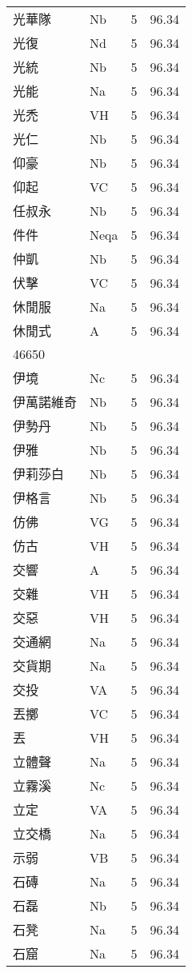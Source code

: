 \documentclass[twocolumn]{book}
\begin{document}
\begin{supertabular}{llrr}
光華隊 & Nb & 5 &  96.34\\
光復 & Nd & 5 &  96.34\\
光統 & Nb & 5 &  96.34\\
光能 & Na & 5 &  96.34\\
光禿 & VH & 5 &  96.34\\
光仁 & Nb & 5 &  96.34\\
仰豪 & Nb & 5 &  96.34\\
仰起 & VC & 5 &  96.34\\
任叔永 & Nb & 5 &  96.34\\
件件 & Neqa & 5 &  96.34\\
仲凱 & Nb & 5 &  96.34\\
伏擊 & VC & 5 &  96.34\\
休閒服 & Na & 5 &  96.34\\
休閒式 & A & 5 &  96.34\\
46650\\
伊境 & Nc & 5 &  96.34\\
伊萬諾維奇 & Nb & 5 &  96.34\\
伊勢丹 & Nb & 5 &  96.34\\
伊雅 & Nb & 5 &  96.34\\
伊莉莎白 & Nb & 5 &  96.34\\
伊格言 & Nb & 5 &  96.34\\
仿佛 & VG & 5 &  96.34\\
仿古 & VH & 5 &  96.34\\
交響 & A & 5 &  96.34\\
交雜 & VH & 5 &  96.34\\
交惡 & VH & 5 &  96.34\\
交通網 & Na & 5 &  96.34\\
交貨期 & Na & 5 &  96.34\\
交投 & VA & 5 &  96.34\\
丟擲 & VC & 5 &  96.34\\
丟 & VH & 5 &  96.34\\
立體聲 & Na & 5 &  96.34\\
立霧溪 & Nc & 5 &  96.34\\
立定 & VA & 5 &  96.34\\
立交橋 & Na & 5 &  96.34\\
示弱 & VB & 5 &  96.34\\
石磚 & Na & 5 &  96.34\\
石磊 & Nb & 5 &  96.34\\
石凳 & Na & 5 &  96.34\\
石窟 & Na & 5 &  96.34\\

\end{supertabular}
\end{document}
